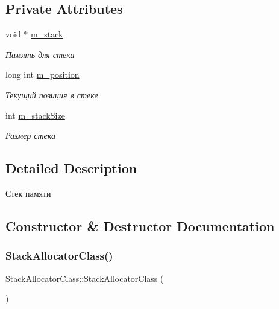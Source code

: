 \subsection*{Private Attributes}
\begin{DoxyCompactItemize}
\item 
void $\ast$ \hyperlink{class_stack_allocator_class_af9a810847486fc3e4b680b02f6d8c775}{m\+\_\+stack}
\begin{DoxyCompactList}\small\item\em Память для стека \end{DoxyCompactList}\item 
long int \hyperlink{class_stack_allocator_class_a5333562b28e793958192855a59508233}{m\+\_\+position}
\begin{DoxyCompactList}\small\item\em Текущий позиция в стеке \end{DoxyCompactList}\item 
int \hyperlink{class_stack_allocator_class_a81800fd71839363c4149b66223b74420}{m\+\_\+stack\+Size}
\begin{DoxyCompactList}\small\item\em Размер стека \end{DoxyCompactList}\end{DoxyCompactItemize}


\subsection{Detailed Description}
Стек памяти 

\subsection{Constructor \& Destructor Documentation}
\mbox{\label{class_stack_allocator_class_aea7c5e14b9c04f98cbfdcabffb8752f7}} 
\subsubsection{\texorpdfstring{Stack\+Allocator\+Class()}{StackAllocatorClass()}\hspace{0.1cm}{\footnotesize\ttfamily [1/2]}}
{\footnotesize\ttfamily Stack\+Allocator\+Class\+::\+Stack\+Allocator\+Class (\begin{DoxyParamCaption}{ }\end{DoxyParamCaption})}

